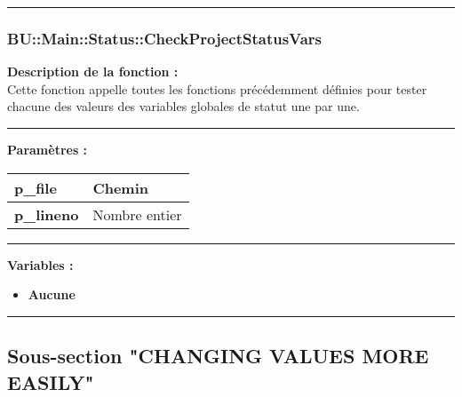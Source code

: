 \documentclass[a4paper,10pt]{article}
\begin{document}

\color{blue}\par\noindent\rule{\textwidth}{0.4pt}\color{white}

\color{blue}
\subsubsection{BU::Main::Status::CheckProjectStatusVars}\color{white}

\begin{justify}
    \textbf{Description de la fonction :}\\[1\baselineskip]
    Cette fonction appelle toutes les fonctions précédemment définies pour tester chacune des valeurs des variables globales de statut une par une.
\end{justify}


\par\noindent\rule{\textwidth}{0.4pt}

\begin{justify}
    \textbf{Paramètres :}\\[1\baselineskip]
    \begin{tabular}{|l|l|}
        \hline
        \textbf{\color{orange}p\_file} & Chemin\\
        \hline
        \textbf{\color{orange}p\_lineno} & Nombre entier\\
        \hline
    \end{tabular}
\end{justify}


\par\noindent\rule{\textwidth}{0.4pt}

\begin{justify}
    \textbf{Variables :}
    \begin{itemize}
        \item \textbf{Aucune}
    \end{itemize}
\end{justify}




\color{green}\par\noindent\rule{\textwidth}{0.4pt}\color{white}

\color{green}
\subsection{Sous-section "CHANGING VALUES MORE EASILY"}\color{white}
\end{document}
